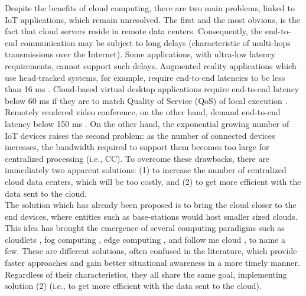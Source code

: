 \noindent\tab Despite the benefits of cloud computing, there are two main problems, linked to IoT applications, which remain unresolved. The first and the most obvious, is the fact that cloud servers reside in remote data centers. Consequently, the end-to-end communication may be subject to long delays (characteristic of multi-hops transmissions over the Internet). Some applications, with ultra-low latency requirements, cannot support such delays. Augmented reality applications which use head-tracked systems, for example, require end-to-end latencies to be less than 16 ms \cite{ellis2004generalizeability}. Cloud-based virtual desktop applications require end-to-end latency below 60 ms if they are to match Quality of Service (QoS) of local execution \cite{taylor2015virtual}. Remotely rendered video conference, on the other hand, demand end-to-end latency below 150 ms \cite{szigeti2005end}. On the other hand, the exponential growing number of IoT devices raises the second problem: as the number of connected devices increases, the bandwidth required to support them becomes too large for centralized processing (i.e., CC). To overcome these drawbacks, there are immediately two apparent solutions: (1) to increase the number of centralized cloud data centers, which will be too costly, and (2) to get more efficient with the data sent to the cloud.\\
\noindent\tab The solution which has already been proposed is to bring the cloud closer to the end devices, where entities such as base-stations would host smaller sized clouds. This idea has brought the emergence of several computing paradigms such as cloudlets \cite{satyanarayanan2013cloudlets}, fog computing \cite{bonomi2012fog}, edge computing \cite{davy2014challenges}, and follow me cloud \cite{taleb2013follow}, to name a few. These are different solutions, often confused in the literature, which provide faster approaches and gain better situational awareness in a more timely manner. Regardless of their characteristics, they all share the same goal, implementing solution (2) (i.e., to get more efficient with the data sent to the cloud).\\
